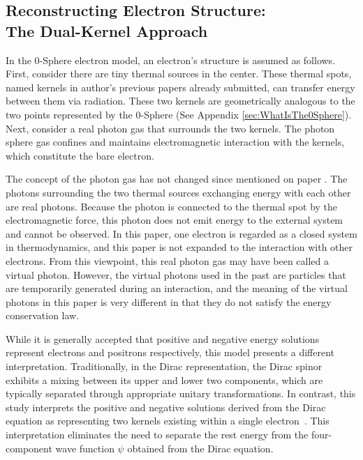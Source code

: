 \documentclass[%
 reprint,
 amsmath,amssymb,
 aps,
]{revtex4-1}
\numberwithin{equation}{section}%
\begin{document}
\subsection{Reconstructing Electron Structure:\\ The Dual-Kernel Approach}
\label{sec:ReconstructingElectronStructure}

In the 0-Sphere electron model, an electron's structure is assumed as follows. First, consider there are tiny thermal sources in the center. These thermal spots, named kernels in author's previous papers already submitted, can transfer energy between them via radiation. These two kernels are geometrically analogous to the two points represented by the 0-Sphere (See Appendix \ref{sec:WhatIsThe0Sphere}). Next, consider a real photon gas that surrounds the two kernels. The photon sphere gas confines and maintains electromagnetic interaction with the kernels, which constitute the bare electron.

The concept of the photon gas has not changed since mentioned on paper \cite{Hanamura2018, Hanamura2023}. The photons surrounding the two thermal sources exchanging energy with each other are real photons. Because the photon is connected to the thermal spot by the electromagnetic force, this photon does not emit energy to the external system and cannot be observed. In this paper, one electron is regarded as a closed system in thermodynamics, and this paper is not expanded to the interaction with other electrons. From this viewpoint, this real photon gas may have been called a virtual photon. However, the virtual photons used in the past are particles that are temporarily generated during an interaction, and the meaning of the virtual photons in this paper is very different in that they do not satisfy the energy conservation law.

While it is generally accepted that positive and negative energy solutions represent electrons and positrons respectively, this model presents a different interpretation. Traditionally, in the Dirac representation, the Dirac spinor exhibits a mixing between its upper and lower two components, which are typically separated through appropriate unitary transformations. In contrast, this study interprets the positive and negative solutions derived from the Dirac equation as representing two kernels existing within a single electron~\cite{Hanamura2020}. This interpretation eliminates the need to separate the rest energy from the four-component wave function $\psi$ obtained from the Dirac equation.
\end{document}
